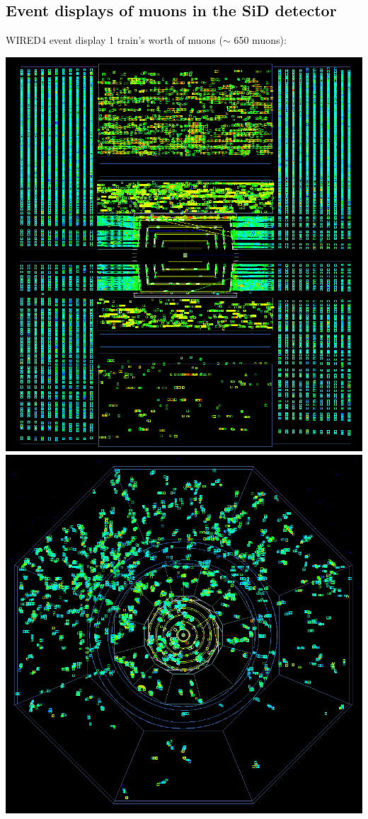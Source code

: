 \documentclass[xcolor={dvipsnames}]{beamer}
\begin{document}
\subsection{Event displays of muons in the SiD detector}
\begin{frame}{WIRED4 event display}
1 train's worth of muons ($\sim$ 650 muons):
\begin{center}
\includegraphics[height=0.6\textheight]{sidloi3_muons_wired4_eventdisplay_1bunch.png}
\hspace*{0.2cm}
\includegraphics[height=0.6\textheight]{sidloi3_muons_wired4_eventdisplay_xy_view_1bunch.png}

\end{center}
\end{frame}
\end{document}

